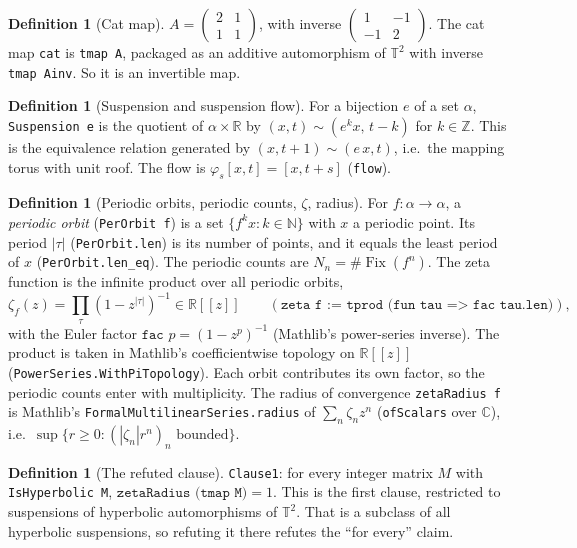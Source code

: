 \documentclass[11pt]{article}
\theoremstyle{definition}
\newtheorem{definition}[theorem]{Definition}
\newcommand{\Fix}{\operatorname{Fix}}
\newcommand{\Z}{\mathbb{Z}}
\newcommand{\R}{\mathbb{R}}
\newcommand{\C}{\mathbb{C}}
\newcommand{\T}{\mathbb{T}}
\begin{document}
\begin{definition}[Cat map]
$A=\begin{pmatrix}2&1\\1&1\end{pmatrix}$, with inverse $\begin{pmatrix}1&-1\\-1&2\end{pmatrix}$. The
cat map \texttt{cat} is \texttt{tmap A}, packaged as an additive automorphism of $\T^2$ with inverse
\texttt{tmap Ainv}. So it is an invertible map.
\end{definition}

\begin{definition}[Suspension and suspension flow]
For a bijection $e$ of a set $\alpha$, \texttt{Suspension e} is the quotient of $\alpha\times\R$ by
$(x,t)\sim(e^kx,\,t-k)$ for $k\in\Z$. This is the equivalence relation generated by
$(x,t+1)\sim(e\,x,t)$, i.e.\ the mapping torus with unit roof. The flow is
$\varphi_s[x,t]=[x,t+s]$ (\texttt{flow}).
\end{definition}

\begin{definition}[Periodic orbits, periodic counts, $\zeta$, radius]
For $f:\alpha\to\alpha$, a \emph{periodic orbit} (\texttt{PerOrbit f}) is a set
$\{f^kx:k\in\mathbb N\}$ with $x$ a periodic point. Its period $|\tau|$ (\texttt{PerOrbit.len}) is its
number of points, and it equals the least period of $x$ (\texttt{PerOrbit.len\_eq}). The periodic
counts are $N_n=\#\Fix(f^n)$. The zeta function is the infinite product over all periodic orbits,
\[
\zeta_f(z)=\prod_{\tau}(1-z^{|\tau|})^{-1}\in\R[[z]]
\qquad(\texttt{zeta f := tprod (fun tau => fac tau.len)}),
\]
with the Euler factor $\texttt{fac }p=(1-z^p)^{-1}$ (Mathlib's power-series inverse). The product is
taken in Mathlib's coefficientwise topology on $\R[[z]]$ (\texttt{PowerSeries.WithPiTopology}). Each
orbit contributes its own factor, so the periodic counts enter with multiplicity. The radius of
convergence \texttt{zetaRadius f} is Mathlib's \texttt{FormalMultilinearSeries.radius} of
$\sum_n \zeta_n z^n$ (\texttt{ofScalars} over $\C$), i.e.\
$\sup\{r\ge0: (|\zeta_n|r^n)_n \text{ bounded}\}$.
\end{definition}

\begin{definition}[The refuted clause]
\texttt{Clause1}: for every integer matrix $M$ with \texttt{IsHyperbolic M},
$\texttt{zetaRadius (tmap M)}=1$. This is the first clause, restricted to suspensions of hyperbolic
automorphisms of $\T^2$. That is a subclass of all hyperbolic suspensions, so refuting it there
refutes the ``for every'' claim.
\end{definition}
\end{document}
